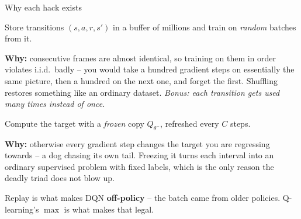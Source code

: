 \documentclass[aspectratio=169]{beamer}
\begin{document}
\begin{frame}{Why each hack exists}
  \begin{tcolorbox}[colback=armorange!12, colframe=armorange, boxrule=0.6pt, arc=2pt,
                    title={\textbf{Experience replay}}]
    \small
    Store transitions $(s,a,r,s')$ in a buffer of millions and train on \emph{random} batches
    from it.

    \vskip 3pt
    \textbf{Why:} consecutive frames are almost identical, so training on them in order violates
    i.i.d.\ badly -- you would take a hundred gradient steps on essentially the same picture,
    then a hundred on the next one, and forget the first. Shuffling restores something like an
    ordinary dataset. \emph{Bonus: each transition gets used many times instead of once.}
  \end{tcolorbox}

  \vskip 6pt
  \begin{tcolorbox}[colback=paramgreen!8, colframe=paramgreen, boxrule=0.6pt, arc=2pt,
                    title={\textbf{Target network}}]
    \small
    Compute the target with a \emph{frozen} copy $Q_{\theta^-}$, refreshed every $C$ steps.

    \vskip 3pt
    \textbf{Why:} otherwise every gradient step changes the target you are regressing towards --
    a dog chasing its own tail. Freezing it turns each interval into an ordinary supervised
    problem with fixed labels, which is the only reason the deadly triad does not blow up.
  \end{tcolorbox}

  \vskip 4pt
  \begin{center}
    \scriptsize
    Replay is what makes DQN \textbf{off-policy} -- the batch came from older policies.
    Q-learning's $\max$ is what makes that legal.
  \end{center}
\end{frame}
\end{document}
